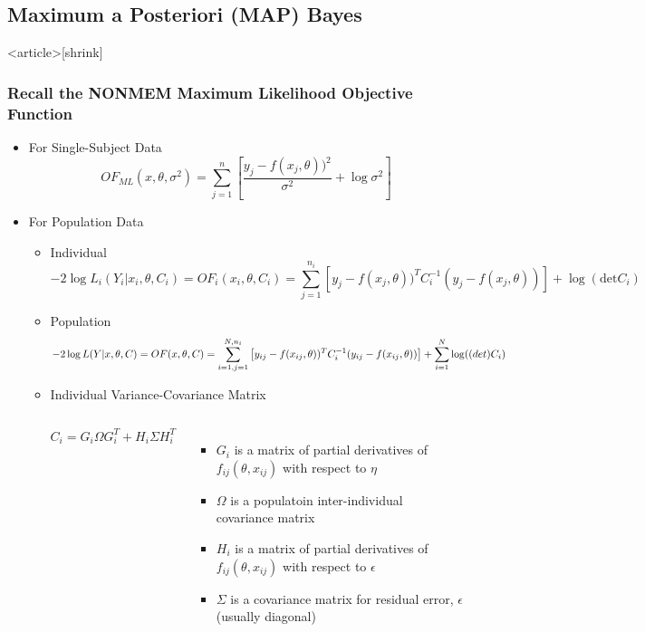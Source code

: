 \documentclass[handout]{beamer}
\begin{document}
\subsection{Maximum a Posteriori (MAP) Bayes}




\begin{frame}<article>[shrink]
  \frametitle{\large Recall the NONMEM Maximum Likelihood Objective Function}

  \begin{itemize}
  \item For Single-Subject Data
$$OF_{ML}(x,\theta,\sigma^2) = \sum_{j=1}^{n}\left[\frac{y_j - f(x_j,\theta))^2}{\sigma^2} + \log\sigma^2\right]$$
\item For Population Data
  \begin{itemize}
  \item Individual
$$ -2\log L_i(Y_i|x_i,\theta,C_i) = OF_i(x_i,\theta,C_i) = \sum_{j=1}^{n_i}\left[y_j - f(x_j,\theta))^TC_i^{-1}(y_j-f(x_j,\theta))\right]+\log(\text{det}C_i)$$
\item Population
$$ -2\log L(Y|x,\theta,C) = OF(x,\theta,C) = \sum_{i=1,j=1}^{N,n_i}\left[y_{ij}-f(x_{ij},\theta))^TC_i^{-1}(y_{ij}-f(x_{ij},\theta))\right] + \sum_{i=1}^N\log(\text(det)C_i) $$
\item Individual Variance-Covariance Matrix
\begin{columns}
$$ C_i = G_i\Omega G_i^T + H_i\Sigma H_i^T$$
\begin{itemize}
\item $G_i$ is a matrix of partial derivatives of
  $f_{ij}(\theta,x_{ij})$ with respect to $\eta$
\item $\Omega$ is a populatoin inter-individual covariance matrix
\item $H_i$ is a matrix of partial derivatives of
  $f_{ij}(\theta, x_{ij})$ with respect to $\epsilon$
\item $\Sigma$ is a covariance matrix for residual error, $\epsilon$
  (usually diagonal)
\end{itemize}
\end{columns}
\end{itemize}
\end{itemize}

\end{frame}
\end{document}
